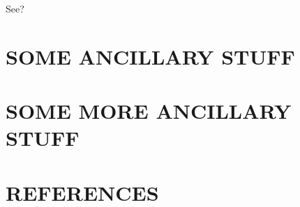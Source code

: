 \documentclass[12pt,econ]{sources/authesis}
\def\ssp{\def\baselinestretch{1.0}\large\normalsize}
\theoremstyle{definition}
\theoremstyle{definition}
\theoremstyle{definition}
\theoremstyle{remark}
\begin{document}
See?

\appendix

\chapter{SOME ANCILLARY STUFF}\label{some-ancillary-stuff}

\chapter{SOME MORE ANCILLARY STUFF}\label{some-more-ancillary-stuff}

\chapter*{REFERENCES}\label{references}

\noindent

\ssp
\end{document}
